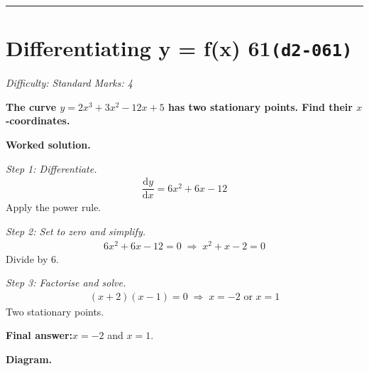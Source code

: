 \documentclass[11pt]{article}
\newcommand{\question}[1]{\par\medskip\noindent\textbf{#1}\par}
\begin{document}
\medskip\hrule

\section*{Differentiating y = f(x) 61\quad\small\texttt{(d2-061)}}
\textit{Difficulty: Standard \quad\textbar\quad Marks: 4}

\question{The curve \( y = 2x^3 + 3x^2 - 12x + 5 \) has two stationary points. Find their \( x \)-coordinates.}

\textbf{Worked solution.}

\textit{Step 1: Differentiate.}
\[\begin{gathered}
\dfrac{\mathrm{d}y}{\mathrm{d}x} = 6x^2 + 6x - 12
\end{gathered}\]
Apply the power rule.

\textit{Step 2: Set to zero and simplify.}
\[\begin{gathered}
6x^2 + 6x - 12 = 0 \;\Rightarrow\; x^2 + x - 2 = 0
\end{gathered}\]
Divide by 6.

\textit{Step 3: Factorise and solve.}
\[\begin{gathered}
(x + 2)(x - 1) = 0 \;\Rightarrow\; x = -2 \text{ or } x = 1
\end{gathered}\]
Two stationary points.

\begin{answerbox}
\textbf{Final answer:}\quad \(\displaystyle  x = -2 \) and \(\displaystyle  x = 1 \).
\end{answerbox}
\textbf{Diagram.}
\end{document}
